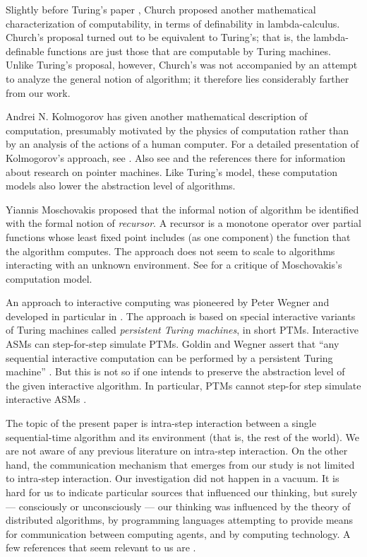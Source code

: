\documentclass{LMCS}
\theoremstyle{definition}
\begin{document}
Slightly before Turing's paper \cite{turing}, Church \cite{church}
proposed another mathematical characterization of computability, in
terms of definability in lambda-calculus.  Church's proposal
turned out to be equivalent to Turing's; that is, the lambda-definable
functions are just those that are computable by Turing machines.
Unlike Turing's proposal, however, Church's was not accompanied by an
attempt to analyze the general notion of algorithm; it therefore lies
considerably farther from our work.

Andrei N. Kolmogorov \cite{K53} has given another mathematical description
of computation, presumably motivated by the physics of computation rather
than by an analysis of the actions of a human computer.  For a detailed
presentation of Kolmogorov's approach, see \cite{KU58}.  Also see
\cite{abs} and the references there for information about research on
pointer machines.  Like Turing's model, these computation models
also lower the abstraction level of algorithms.

Yiannis Moschovakis \cite{mosch} proposed that the informal notion of
algorithm be identified with the formal notion of \emph{recursor}.  A
recursor is a monotone operator over partial functions whose least fixed
point includes (as one component) the function that the algorithm
computes.  The approach does not seem to scale to algorithms interacting
with an unknown environment.  See \cite[Section~4.3]{abs} for a critique
of Moschovakis's computation model.

An approach to interactive computing was pioneered by Peter Wegner and
developed in particular in \cite{GSAS}.  The approach is based on
special interactive variants of Turing machines called \emph{persistent
Turing machines}, in short PTMs.  Interactive ASMs can step-for-step
simulate PTMs.  Goldin and Wegner assert that ``any sequential interactive
computation can be performed by a persistent Turing machine'' \cite{gsw}.
But this is not so if one intends to preserve the abstraction level of the
given interactive algorithm.  In particular, PTMs cannot step-for step
simulate interactive ASMs \cite{ia05}.

The topic of the present paper is intra-step interaction between a
single sequential-time algorithm and its environment (that is,
the rest of the world).  We are not aware of any previous literature
on intra-step interaction.  On the other hand, the communication
mechanism that emerges from our study is not limited to intra-step
interaction.  Our investigation did not happen in a vacuum.  It is
hard for us to indicate particular sources that influenced our
thinking, but surely --- consciously or unconsciously --- our thinking
was influenced by the theory of distributed algorithms, by programming
languages attempting to provide means for communication between
computing agents, and by computing technology.  A few references that
seem relevant to us are \cite{bcc,lynch, platt, rr, sw}.
\end{document}
